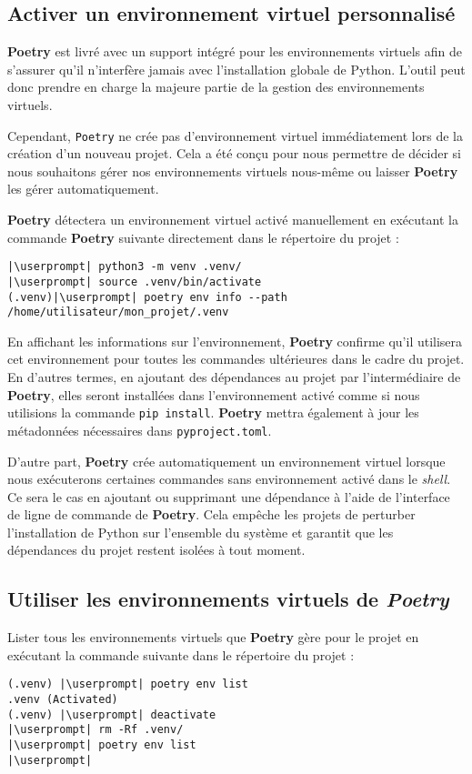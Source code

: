\subsection*{Activer un environnement virtuel personnalisé}
\textbf{Poetry} est livré avec un support intégré pour les environnements virtuels afin de s'assurer qu'il n'interfère jamais avec l'installation globale de Python. L'outil peut donc prendre en charge la majeure partie de la gestion des environnements virtuels.

Cependant, \texttt{Poetry} ne crée pas d'environnement virtuel immédiatement lors de la création d'un nouveau projet. Cela a été conçu pour nous permettre de décider si nous souhaitons gérer nos environnements virtuels nous-même ou laisser \textbf{Poetry} les gérer automatiquement.

\textbf{Poetry} détectera un environnement virtuel activé manuellement en exécutant la commande \textbf{Poetry} suivante directement dans le répertoire du projet :
\begin{lstlisting}[style=bash]
|\userprompt| python3 -m venv .venv/
|\userprompt| source .venv/bin/activate
(.venv)|\userprompt| poetry env info --path
/home/utilisateur/mon_projet/.venv
\end{lstlisting}

En affichant les informations sur l'environnement, \textbf{Poetry} confirme qu'il utilisera cet environnement pour toutes les commandes ultérieures dans le cadre du projet. En d'autres termes, en ajoutant des dépendances au projet par l'intermédiaire de \textbf{Poetry}, elles seront installées dans l'environnement activé comme si nous utilisions la commande \texttt{pip install}. \textbf{Poetry} mettra également à jour les métadonnées nécessaires dans \texttt{pyproject.toml}.

D'autre part, \textbf{Poetry} crée automatiquement un environnement virtuel lorsque nous exécuterons certaines commandes sans environnement activé dans le \textit{shell}. Ce sera le cas en ajoutant ou supprimant une dépendance à l'aide de l'interface de ligne de commande de \textbf{Poetry}. Cela empêche les projets de perturber l'installation de Python sur l'ensemble du système et garantit que les dépendances du projet restent isolées à tout moment.

\subsection*{Utiliser les environnements virtuels de \textit{Poetry}}
Lister tous les environnements virtuels que \textbf{Poetry} gère pour le projet en exécutant la commande suivante dans le répertoire du projet :
\begin{lstlisting}[style=bash]
(.venv) |\userprompt| poetry env list
.venv (Activated)
(.venv) |\userprompt| deactivate
|\userprompt| rm -Rf .venv/
|\userprompt| poetry env list
|\userprompt| 
\end{lstlisting}

